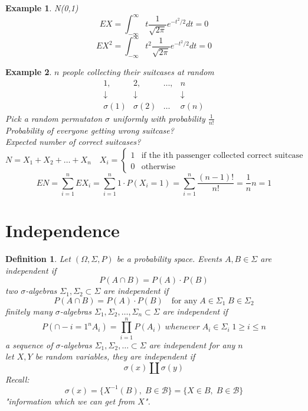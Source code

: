 \documentclass[12pt]{article}
\newtheorem{definition}{Definition}[section]
\newtheorem{example}{Example}[section]
\begin{document}
\begin{example} N(0,1)
\[EX = \int_{-\infty}^{\infty} t \frac{1}{\sqrt{2\pi}}e^{-t^2/2}dt = 0\]
\[EX^2 = \int_{-\infty}^{\infty} t^2 \frac{1}{\sqrt{2\pi}}e^{-t^2/2}dt = 0\]
\end{example}
\begin{example}
$n$ people collecting their suitcases at random \[\begin{array}{cccc}
1, &2, &\dots, &n\\
\downarrow &\downarrow & &\downarrow \\
\sigma(1) &\sigma(2) &\dots &\sigma(n) \end{array}\]
Pick a random permutaton $\sigma$ uniformly with probability $\frac{1}{n!}$\\
Probability of everyone getting wrong suitcase?\\
Expected number of correct suitcases?
\[N=X_1 + X_2 +\dots + X_n \quad X_i = \begin{cases} 1 & \text{if the ith passenger collected correct suitcase}\\
0 & \text{otherwise} \end{cases} \]
\[EN = \sum_{i=1}^{n}EX_i = \sum_{i=1}^{n}1\cdot P(X_i = 1) = \sum_{i=1}^{n}\frac{(n-1)!}{n!} = \frac{1}{n}n = 1\]
\end{example}

\section{Independence}

\begin{definition} Let $(\Omega , \Sigma , P)$ be a probability space. Events $A,B \in \Sigma$ are independent if 
\[P(A \cap B) = P(A)\cdot P(B)\]
two $\sigma$-algebras $\Sigma_1 , \Sigma_2 \subset \Sigma$ are independent if 
\[P(A \cap B) = P(A)\cdot P(B) \quad \text{for any} \; A \in \Sigma_1 \; B \in \Sigma_2 \]
finitely many $\sigma$-algebras $\Sigma_1 , \Sigma_2 , \dots , \Sigma_n \subset \Sigma$ are independent if 
\[P\left(\cap-{i=1}^{n}A_i\right) = \prod_{i=1}^nP(A_i) \; whenever \; A_i \in \Sigma_i \; 1\geq i \leq n \]
a sequence of  $\sigma$-algebras $\Sigma_1 , \Sigma_2 , \dots \subset \Sigma$ are independent for any $n$\\
let $X,Y$ be random variables, they are independent if 
\[\sigma(x) \coprod \sigma(y) \]
Recall: 
\[\sigma(x) = \{ X^{-1}(B), \; B \in \mathcal{B}\} = \{X \in B, \; B \in \mathcal{B}\}\]
"information which we can get from $X$".
\end{definition} 
\end{document}
